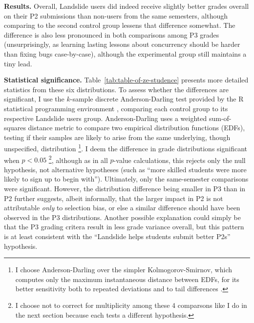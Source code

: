 {\bf Results.}
Overall,
Landslide users did indeed receive
slightly better grades overall on their P2 submissions than non-users from the same semesters,
although comparing to the second control group lessens that difference somewhat.
The difference is also less pronounced in both comparisons among P3 grades
(unsurprisingly, as learning lasting lessons about concurrency should be harder than fixing bugs case-by-case),
although the experimental group still maintains a tiny lead.

{\bf Statistical significance.}
Table~\ref{tab:table-of-ze-studence} presents more detailed statistics from these six distributions.
To assess whether the differences are significant,
I use the $k$-sample discrete Anderson-Darling test \cite{anderson-darling}
provided by the R statistical programming environment \cite{r-lang,r-ksamples},
comparing each control group to its respective Landslide users group.
Anderson-Darling uses a weighted sum-of-squares distance metric to compare two empirical distribution functions (EDFs),
testing if their samples are likely to arise from the same underlying, though unspecified, distribution%
\footnote{
I choose Anderson-Darling over the simpler Kolmogorov-Smirnov,
which computes only the maximum instantaneous distance between EDFs,
for its better sensitivity both to repeated deviations and to tail differences \cite{beware-kolmogorov-smirnov}.
}.
I deem the difference in grade distributions significant when $p < 0.05$%
\footnote{I choose not to correct for multiplicity among these 4 comparsons like I do in the next section
because each tests a different hypothesis.
},
although as in all $p$-value calculations,
this rejects only the null hypothesis,
not alternative hypotheses (such as ``more skilled students were more likely to sign up to begin with'').
%
Ultimately, only the same-semester comparisons were significant.
However, the distribution difference being smaller in P3 than in P2
further suggests, albeit informally,
that the larger impact in P2 is not attributable {\em only} to selection bias,
or else a similar difference should have been observed in the P3 distributions.
Another possible explanation could simply be that the P3 grading critera result in less grade variance overall,
but this pattern is at least consistent with the ``Landslide helps students submit better P2s'' hypothesis.

